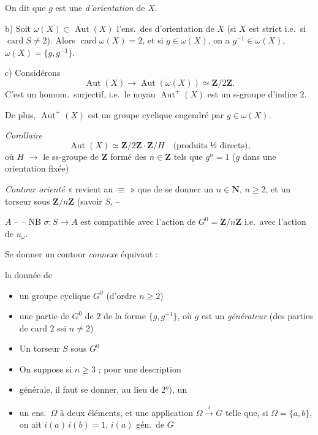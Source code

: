 \documentclass[11pt,a4paper]{article}
\begin{document}
\struck{\ill{}}  On dit que $g$ est une \struck{\ill{}}
\emph{d'orientation} de $X$.

b) Soit $\omega(X) \subset \operatorname{Aut}(X)$ l'ens.\ des \struck{\ill{}}
d'orientation de $X$ (si $X$ est strict i.e.\ si $\operatorname{card} S \neq 2$).
Alors $\operatorname{card} \omega(X) = 2$, \struck{\ill{}} et si
$g \in \omega(X)$, on a $g^{-1} \in \omega(X)$, $\omega(X) = \{g, g^{-1}\}$.

c) 
Considérons
\[
  \operatorname{Aut}(X) \to \operatorname{Aut}(\omega(X)) \simeq \mathbf{Z}/2\mathbf{Z}.
\]
C'est un homom.\ surjectif, i.e.\ le noyau $\operatorname{Aut}^{+}(X)$ est un
s-groupe d'indice $2$.

De plus, $\operatorname{Aut}^{+}(X)$ est un groupe cyclique engendré par
 $g \in \omega(X)$.

\emph{Corollaire}
\[
  \operatorname{Aut}(X) \simeq \mathbf{Z}/2\mathbf{Z} \cdot \mathbf{Z}/H
  \quad \text{(produits ½ directs),}
\]
où $H$ $\to$ le ss-groupe de $\mathbf{Z}$ formé des $n \in \mathbf{Z}$ tels que
$g^n = 1$ ($g$ dans une orientation fixée)

\emph{Contour} \emph{orienté} « revient au $\equiv$ » que de se
donner un $n \in \mathbf{N}$, $n \geq 2$, et un  torseur sous
$\mathbf{Z}/n\mathbf{Z}$ (savoir $S$, --

$A$ --  -- NB $\sigma : S \to A$ est compatible avec l'action
de $G^0 = \mathbf{Z}/n\mathbf{Z}$ i.e.\ avec l'action de $u_\omega$.

Se donner un contour \emph{connexe} équivaut :

la donnée de
\begin{itemize}
  \item[1°)] un groupe cyclique $G^0$ (d'ordre $n \geq 2$)
  \item[2°)] une \struck{\ill{}} partie de $G^0$  de $2$ \ill{}
    de la forme $\{g, g^{-1}\}$, où $g$ est un \emph{générateur} (des
    parties de card $2$ ssi $n \neq 2$)
  \item[3°)] Un torseur $S$ sous $G^0$
\end{itemize}

\begin{itemize}
  \item[$\bullet$] On suppose si $n \geq 3$ \struck{\ill{}} ; pour une
    description
  \item[$\bullet$] générale, il faut se donner, au lieu de 2°), un
\end{itemize}
\begin{itemize}
  \item[2 bis)] un ens.\ $\Omega$ à deux éléments, et une application
    $\Omega \xrightarrow{i} G$ telle que, si $\Omega = \{a, b\}$, on ait
    $i(a)\, i(b) = 1$, $i(a)$ gén.\ de $G$
\end{itemize}
\end{document}
